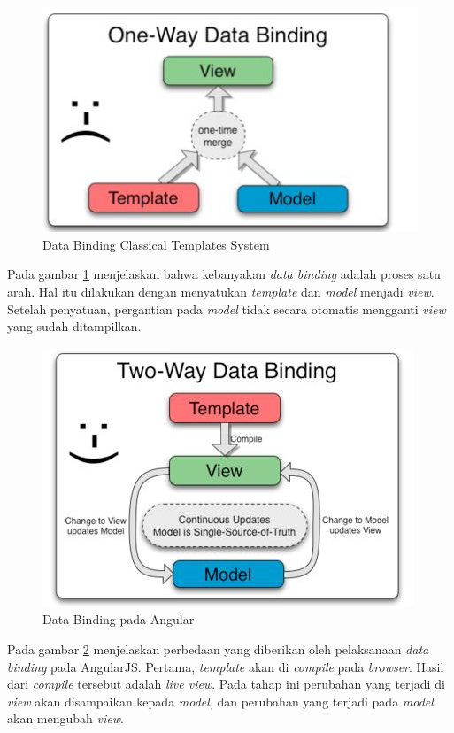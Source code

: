 	\begin{figure}[H]
		\centering
		\includegraphics[scale=0.75]{Gambar/Dabin1}
		\caption{Data Binding Classical Templates System}
		\label{fig:dabin1}
	\end{figure}
	Pada gambar \ref{fig:dabin1} menjelaskan bahwa kebanyakan \textit{data binding} adalah proses satu arah. Hal itu dilakukan dengan menyatukan \textit{template} dan \textit{model} menjadi \textit{view}. Setelah penyatuan, pergantian pada \textit{model} tidak secara otomatis mengganti \textit{view} yang sudah ditampilkan.
	\begin{figure}[H]
		\centering
		\includegraphics[scale=0.75]{Gambar/Dabin2}
		\caption{Data Binding pada Angular}
		\label{fig:dabin2}
	\end{figure}
	Pada gambar \ref{fig:dabin2} menjelaskan perbedaan yang diberikan oleh pelaksanaan \textit{data binding} pada AngularJS. Pertama, \textit{template} akan di \textit{compile} pada \textit{browser}. Hasil dari \textit{compile} tersebut adalah \textit{live view}. Pada tahap ini perubahan yang terjadi di \textit{view} akan disampaikan kepada \textit{model}, dan perubahan yang terjadi pada \textit{model} akan mengubah \textit{view}.
	
